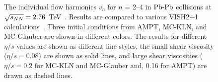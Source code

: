 \begin{figure}[h]
\begin{center}
        \caption{The individual flow harmonics $v_n$ for $n$ = 2--4 in $\textnormal{Pb-Pb}$ collisions at $\sqrt{s_{NN}}=2.76$~TeV~\cite{Adam:2016izf}. Results are compared to various VISH2+1 calculations~\cite{Zhu:2016puf}. Three initial conditions from AMPT, MC-KLN, and MC-Glauber are shown in different colors. The results for different $\eta/s$ values are shown as different line styles, the small shear viscosity ($\eta/s = 0.08$) are shown as solid lines, and large shear viscosities ($\eta/s = 0.2$ for MC-KLN and MC-Glauber and, 0.16 for AMPT) are drawn as dashed lines.}
        \label{fig:Figure_A2}
              \end{center}
\end{figure}

